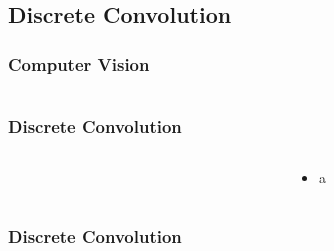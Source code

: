 \documentclass[aspectratio=169]{beamer}
\newcommand\imageright[1]{ %
    \caption*{\scalebox{.5}{\textcolor{lightgray}{\textcopyright~#1}}} %
}
\begin{document}
\subsection{Discrete Convolution}
\label{subsec:discrete-convolution}

\begin{frame}
\frametitle{Computer Vision}

\begin{columns}
    \begin{column}{0.48\textwidth}
    \end{column}
    \begin{column}{0.48\textwidth}
    \end{column}
\end{columns}
\end{frame}

\begin{frame}
\frametitle{Discrete Convolution}

\begin{columns}
    \begin{column}{0.48\textwidth}
        \begin{figure}
            \centering
        \end{figure}
    \end{column}
    \begin{column}{0.48\textwidth}
        \begin{itemize}
            \item a
        \end{itemize}
    \end{column}
\end{columns}
\end{frame}

\begin{frame}
    \frametitle{Discrete Convolution}
    \begin{figure}
        \centering
        \imageright{Machine Learning Guru}
    \end{figure}
\end{frame}
\end{document}
